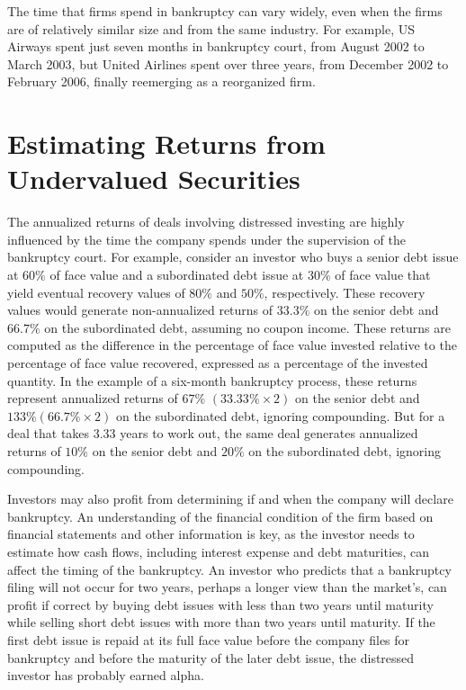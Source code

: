 \documentclass[11pt]{article}
\begin{document}
The time that firms spend in bankruptcy can vary widely, even when the firms are of relatively similar size and from the same industry. For example, US Airways spent just seven months in bankruptcy court, from August 2002 to March 2003, but United Airlines spent over three years, from December 2002 to February 2006, finally reemerging as a reorganized firm.

\section*{Estimating Returns from Undervalued Securities}
The annualized returns of deals involving distressed investing are highly influenced by the time the company spends under the supervision of the bankruptcy court. For example, consider an investor who buys a senior debt issue at $60 \%$ of face value and a subordinated debt issue at $30 \%$ of face value that yield eventual recovery values of $80 \%$ and $50 \%$, respectively. These recovery values would generate non-annualized returns of $33.3 \%$ on the senior debt and $66.7 \%$ on the subordinated debt, assuming no coupon income. These returns are computed as the difference in the percentage of face value invested relative to the percentage of face value recovered, expressed as a percentage of the invested quantity. In the example of a six-month bankruptcy process, these returns represent annualized returns of $67 \%$ $(33.33 \% \times 2)$ on the senior debt and $133 \%(66.7 \% \times 2)$ on the subordinated debt, ignoring compounding. But for a deal that takes 3.33 years to work out, the same deal generates annualized returns of $10 \%$ on the senior debt and $20 \%$ on the subordinated debt, ignoring compounding.

Investors may also profit from determining if and when the company will declare bankruptcy. An understanding of the financial condition of the firm based on financial statements and other information is key, as the investor needs to estimate how cash flows, including interest expense and debt maturities, can affect the timing of the bankruptcy. An investor who predicts that a bankruptcy filing will not occur for two years, perhaps a longer view than the market's, can profit if correct by buying debt issues with less than two years until maturity while selling short debt issues with more than two years until maturity. If the first debt issue is repaid at its full face value before the company files for bankruptcy and before the maturity of the later debt issue, the distressed investor has probably earned alpha.
\end{document}
